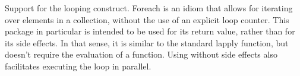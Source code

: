 	Support for the  looping construct. Foreach is an idiom that
	allows for iterating over elements in a collection, without the use of
	an explicit loop counter. This package in particular is intended to be
	used for its return value, rather than for its side effects. In that
	sense, it is similar to the standard lapply function, but doesn't
	require the evaluation of a function. Using  without side effects
	also facilitates executing the loop in parallel.
